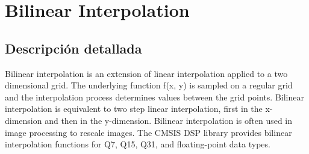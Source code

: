 \hypertarget{group___bilinear_interpolate}{}\section{Bilinear Interpolation}
\label{group___bilinear_interpolate}


\subsection{Descripción detallada}
Bilinear interpolation is an extension of linear interpolation applied to a two dimensional grid. The underlying function {\ttfamily f(x, y)} is sampled on a regular grid and the interpolation process determines values between the grid points. Bilinear interpolation is equivalent to two step linear interpolation, first in the x-\/dimension and then in the y-\/dimension. Bilinear interpolation is often used in image processing to rescale images. The C\+M\+S\+IS D\+SP library provides bilinear interpolation functions for Q7, Q15, Q31, and floating-\/point data types.

